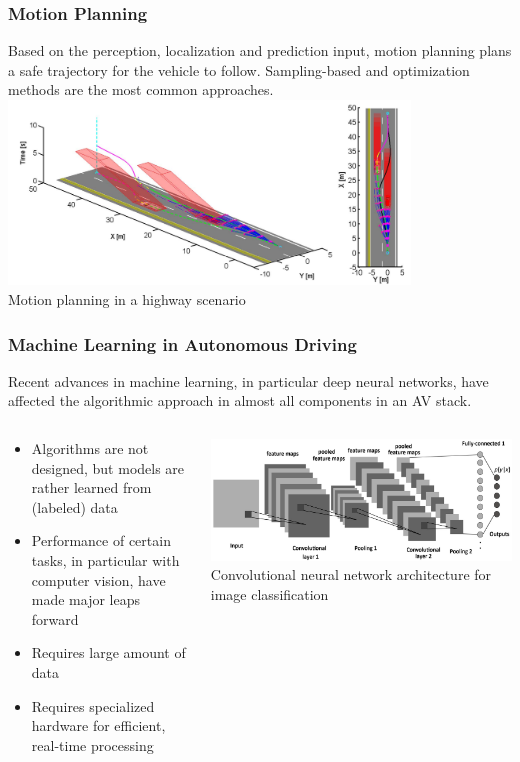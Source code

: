 \begin{frame}
\frametitle{Motion Planning}
Based on the perception, localization and prediction input, motion planning
plans a safe trajectory for the vehicle to follow. Sampling-based and
optimization methods are the most common approaches.\\
\centering
\includegraphics[width=0.8\textwidth]{images/ma_motionplanning.png}\\
\footnotesize{Motion planning in a highway scenario \cite{Ma2015}}
\end{frame}

\begin{frame}
\frametitle{Machine Learning in Autonomous Driving}
Recent advances in machine learning, in particular deep neural networks, have
affected the algorithmic approach in almost all components in an AV stack.
\begin{columns}[]
    \begin{column}{0.4\textwidth}
        \begin{itemize}
            \item Algorithms are not designed, but models are rather learned
                from (labeled) data
            \item Performance of certain tasks, in particular with computer
                vision, have made major leaps forward
            \item Requires large amount of data
            \item Requires specialized hardware for efficient, real-time 
                processing
        \end{itemize}
    \end{column}
    \begin{column}{0.6\textwidth}
        \centering
        \includegraphics[width=\textwidth]{images/cnn_architecture.png}\\
        \footnotesize{Convolutional neural network architecture for image classification \cite{Albelwi2017}}
    \end{column}
\end{columns}
\end{frame}

